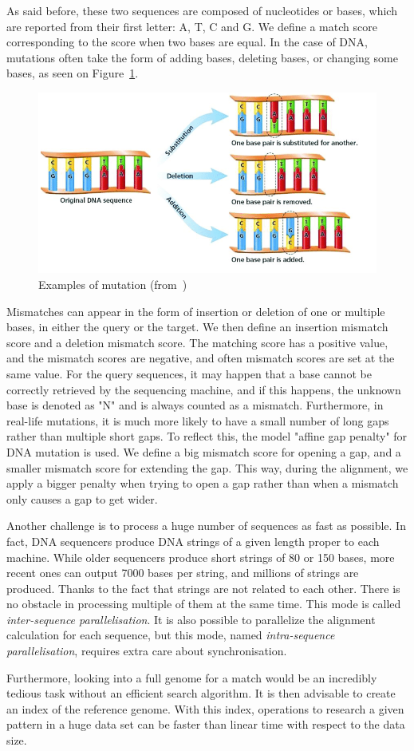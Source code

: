 As said before, these two sequences are composed of nucleotides or bases, which are reported from their first letter: A, T, C and G. We define a match score corresponding to the score when two bases are equal. In the case of DNA, mutations often take the form of adding bases, deleting bases, or changing some bases, as seen on Figure~\ref{fig:mutation}. 
\begin{figure}[h!]
	\centering
	\includegraphics[width=0.7\linewidth]{mutation}
	\caption{Examples of mutation (from~\cite{alasadi:chemistry})}
	\label{fig:mutation}
\end{figure}
Mismatches can appear in the form of insertion or deletion of one or multiple bases, in either the query or the target. We then define an insertion mismatch score and a deletion mismatch score. The matching score has a positive value, and the mismatch scores are negative, and often mismatch scores are set at the same value. For the query sequences, it may happen that a base cannot be correctly retrieved by the sequencing machine, and if this happens, the unknown base is denoted as "N" and is always counted as a mismatch. Furthermore, in real-life mutations, it is much more likely to have a small number of long gaps rather than multiple short gaps. To reflect this, the model "affine gap penalty" for DNA mutation is used. We define a big mismatch score for opening a gap, and a smaller mismatch score for extending the gap. This way, during the alignment, we apply a bigger penalty when trying to open a gap rather than when a mismatch only causes a gap to get wider. 

Another challenge is to process a huge number of sequences as fast as possible. In fact, DNA sequencers produce DNA strings of a given length proper to each machine. While older sequencers produce short strings of 80 or 150 bases, more recent ones can output 7000 bases per string, and millions of strings are produced. Thanks to the fact that strings are not related to each other. There is no obstacle in processing multiple of them at the same time. This mode is called \emph{inter-sequence parallelisation}. It is also possible to parallelize the alignment calculation for each sequence, but this mode, named \emph{intra-sequence parallelisation}, requires extra care about synchronisation.

Furthermore, looking into a full genome for a match would be an incredibly tedious task without an efficient search algorithm. It is then advisable to create an index of the reference genome. With this index, operations to research a given pattern in a huge data set can be faster than linear time with respect to the data size.

